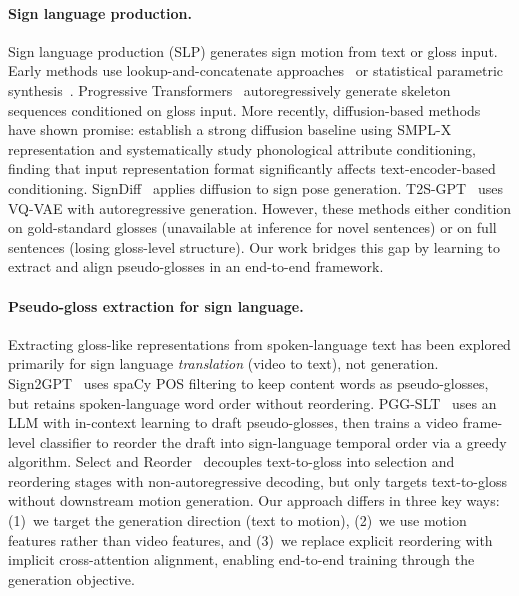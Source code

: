 \documentclass{article}
\begin{document}
\paragraph{Sign language production.}
Sign language production (SLP) generates sign motion from text or gloss input.
Early methods use lookup-and-concatenate approaches~\citep{mcdonald2016automated} or statistical parametric synthesis~\citep{cox2002tessa}.
Progressive Transformers~\citep{saunders2020progressive,saunders2021continuous} autoregressively generate skeleton sequences conditioned on gloss input.
More recently, diffusion-based methods have shown promise: \citet{hong2026phonologyguided} establish a strong diffusion baseline using SMPL-X representation and systematically study phonological attribute conditioning, finding that input representation format significantly affects text-encoder-based conditioning.
SignDiff~\citep{fang2023signdiff} applies diffusion to sign pose generation.
T2S-GPT~\citep{xie2024t2sgpt} uses VQ-VAE with autoregressive generation.
However, these methods either condition on gold-standard glosses (unavailable at inference for novel sentences) or on full sentences (losing gloss-level structure).
Our work bridges this gap by learning to extract and align pseudo-glosses in an end-to-end framework.

\paragraph{Pseudo-gloss extraction for sign language.}
Extracting gloss-like representations from spoken-language text has been explored primarily for sign language \emph{translation} (video to text), not generation.
Sign2GPT~\citep{zheng2023sign2gpt} uses spaCy POS filtering to keep content words as pseudo-glosses, but retains spoken-language word order without reordering.
PGG-SLT~\citep{wong2025pgg} uses an LLM with in-context learning to draft pseudo-glosses, then trains a video frame-level classifier to reorder the draft into sign-language temporal order via a greedy algorithm.
Select and Reorder~\citep{walsh2024select} decouples text-to-gloss into selection and reordering stages with non-autoregressive decoding, but only targets text-to-gloss without downstream motion generation.
Our approach differs in three key ways: (1)~we target the generation direction (text to motion), (2)~we use motion features rather than video features, and (3)~we replace explicit reordering with implicit cross-attention alignment, enabling end-to-end training through the generation objective.
\end{document}
